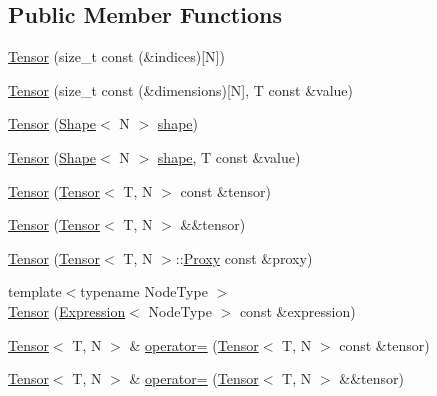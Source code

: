 \subsection*{Public Member Functions}
\begin{DoxyCompactItemize}
\item 
\hyperlink{classtensor_1_1Tensor_ac8fe69c54ef48595983b4fc06624fcb6}{Tensor} (size\+\_\+t const (\&indices)\mbox{[}N\mbox{]})
\item 
\hyperlink{classtensor_1_1Tensor_a484451b19915ad181d2a077416879448}{Tensor} (size\+\_\+t const (\&dimensions)\mbox{[}N\mbox{]}, T const \&value)
\item 
\hyperlink{classtensor_1_1Tensor_aa8d5f8097ed9c58f02eefca13cd6e4d5}{Tensor} (\hyperlink{classtensor_1_1Shape}{Shape}$<$ N $>$ \hyperlink{classtensor_1_1Tensor_a27f61bd247cbcc9c3a62ca54fec494dd}{shape})
\item 
\hyperlink{classtensor_1_1Tensor_a2682312974ba42709168df871ec7ebd9}{Tensor} (\hyperlink{classtensor_1_1Shape}{Shape}$<$ N $>$ \hyperlink{classtensor_1_1Tensor_a27f61bd247cbcc9c3a62ca54fec494dd}{shape}, T const \&value)
\item 
\hyperlink{classtensor_1_1Tensor_afd24db7e7bbd4d1864063096b45966ec}{Tensor} (\hyperlink{classtensor_1_1Tensor}{Tensor}$<$ T, N $>$ const \&tensor)
\item 
\hyperlink{classtensor_1_1Tensor_a9b8003676fbd417e782269f31448e82e}{Tensor} (\hyperlink{classtensor_1_1Tensor}{Tensor}$<$ T, N $>$ \&\&tensor)
\item 
\hyperlink{classtensor_1_1Tensor_af8a1444d9f38bbe897740f0030199f46}{Tensor} (\hyperlink{classtensor_1_1Tensor}{Tensor}$<$ T, N $>$\+::\hyperlink{classtensor_1_1Tensor_1_1Proxy}{Proxy} const \&proxy)
\item 
{\footnotesize template$<$typename Node\+Type $>$ }\\\hyperlink{classtensor_1_1Tensor_ac325584759f20036bb5952a0701ee06d}{Tensor} (\hyperlink{structtensor_1_1Expression}{Expression}$<$ Node\+Type $>$ const \&expression)
\item 
\hyperlink{classtensor_1_1Tensor}{Tensor}$<$ T, N $>$ \& \hyperlink{classtensor_1_1Tensor_a9d457724cf49cf72336afc8f87da5436}{operator=} (\hyperlink{classtensor_1_1Tensor}{Tensor}$<$ T, N $>$ const \&tensor)
\item 
\hyperlink{classtensor_1_1Tensor}{Tensor}$<$ T, N $>$ \& \hyperlink{classtensor_1_1Tensor_ae4850d0bd0e1de0e1e2ed3dcc29e8cf4}{operator=} (\hyperlink{classtensor_1_1Tensor}{Tensor}$<$ T, N $>$ \&\&tensor)
\item 

\end{DoxyCompactItemize}
